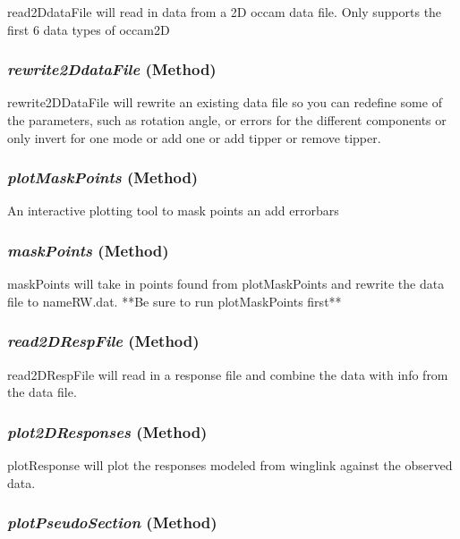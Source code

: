 read2DdataFile will read in data from a 2D occam data file.  
            Only supports the first 6 data types of occam2D

\subsubsection{\textit{rewrite2DdataFile} (Method)}
\label{sssec:.modeling.occamtools.Occam2DData.rewrite2DdataFile}

rewrite2DDataFile will rewrite an existing data file so you can 
        redefine some of the parameters, such as rotation angle, or errors for 
        the different components or only invert for one mode or add one or add
        tipper or remove tipper.

\subsubsection{\textit{plotMaskPoints} (Method)}
\label{sssec:.modeling.occamtools.Occam2DData.plotMaskPoints}

An interactive plotting tool to mask points an add errorbars

\subsubsection{\textit{maskPoints} (Method)}
\label{sssec:.modeling.occamtools.Occam2DData.maskPoints}

maskPoints will take in points found from plotMaskPoints and rewrite 
        the data file to nameRW.dat.  **Be sure to run plotMaskPoints first**

\subsubsection{\textit{read2DRespFile} (Method)}
\label{sssec:.modeling.occamtools.Occam2DData.read2DRespFile}

read2DRespFile will read in a response file and combine the data with info 
        from the data file.

\subsubsection{\textit{plot2DResponses} (Method)}
\label{sssec:.modeling.occamtools.Occam2DData.plot2DResponses}

plotResponse will plot the responses modeled from winglink against the 
        observed data.

\subsubsection{\textit{plotPseudoSection} (Method)}
\label{sssec:.modeling.occamtools.Occam2DData.plotPseudoSection}

